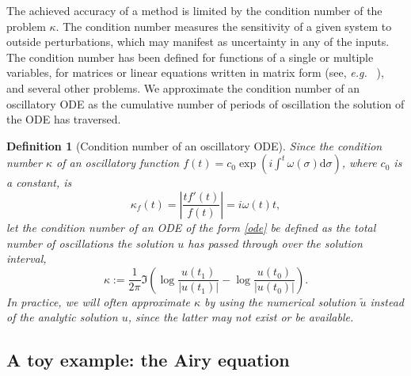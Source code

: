 \documentclass[10pt]{article}
\newcommand{\eg}{{\it e.g.\ }}
\newtheorem{defn}[thm]{Definition}
\newcommand{\om}{\omega}
\begin{document}
The achieved accuracy of a method is limited by the condition number of the
problem $\kappa$. The condition number measures the sensitivity of a given system to
outside perturbations, which may manifest as uncertainty in any of the inputs.
The condition number has been defined for functions of a single or multiple
variables, for matrices or linear equations written in matrix form (see, \eg
\cite{rice1966,trefethenlinalg}), and several other problems. We approximate
the condition number of an oscillatory ODE as the cumulative number of periods of
oscillation the solution of the ODE has traversed.
\begin{defn}[Condition number of an oscillatory ODE]\label{conditionnodef}
    Since the condition number $\kappa$ of an oscillatory function $f(t) =
    c_0\exp(i\int^t \om(\sigma)\mathrm{d}\sigma)$, where $c_0$ is a constant,
    is
    \begin{equation}\label{conditionno}
        \kappa_f(t) = \left| \frac{tf'(t)}{f(t)} \right| = i\om(t)t,
    \end{equation}
    let the condition number of an ODE of the form \cref{ode} be defined as the total number of oscillations the solution $u$ has passed through over the solution interval, 
    \begin{equation}
        \kappa := \frac{1}{2\pi}\Im\left(\log\frac{u(t_1)}{|u(t_1)|}  - \log\frac{u(t_0)}{|u(t_0)|}\right).
    \end{equation}
    In practice, we will often approximate $\kappa$ by using the numerical
    solution $\tilde{u}$ instead of the analytic solution $u$, since the latter may not
    exist or be available.
\end{defn}


\subsection{A toy example: the Airy equation}
\end{document}
